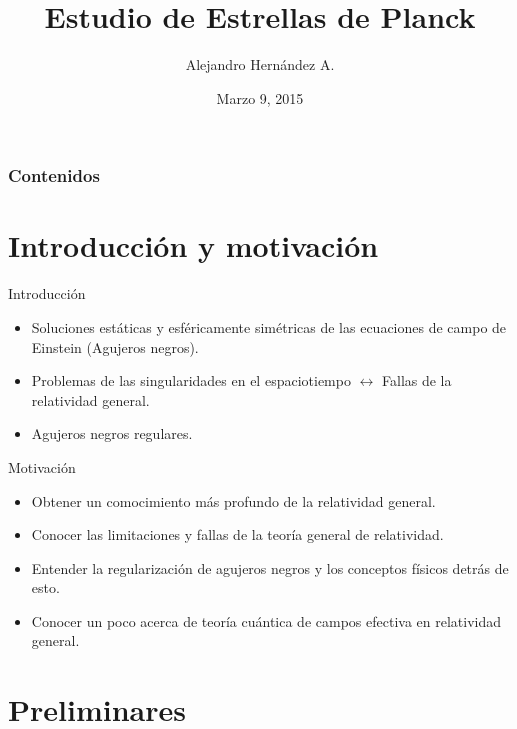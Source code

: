 \documentclass[t]{beamer}
\title[Estrellas de Planck]{Estudio de Estrellas de Planck}
\author[Hernández A.]{Alejandro Hernández A. }
\institute[Uniandes] 
{
Universidad de los Andes, Bogotá, Colombia \\ 
}
\date{Marzo 9, 2015}
\numberwithin{equation}{section}
\begin{document}
\begin{frame}
\titlepage 
\end{frame}

\begin{frame}
\frametitle{Contenidos} 
\tableofcontents 
\end{frame}

\section{Introducción y motivación}

\begin{frame}{Introducción}
\vspace{\fill}
\begin{itemize}
\item Soluciones estáticas y esféricamente simétricas de las ecuaciones de campo de Einstein (Agujeros negros).


\item Problemas de las singularidades en el espaciotiempo $\leftrightarrow$ Fallas de la relatividad general.

\item Agujeros negros regulares.
\end{itemize}
\end{frame}

\begin{frame}{Motivación}
\vspace{\fill}
\begin{itemize}
\item Obtener un comocimiento más profundo de la relatividad general.

\item Conocer las limitaciones y fallas de la teoría general de relatividad.

\item Entender la regularización de agujeros negros y los conceptos físicos detrás de esto.

\item Conocer un poco acerca de teoría cuántica de campos efectiva en relatividad general.

\end{itemize}
\vspace{\fill}
\end{frame}


\section{\label{preliminaries section} Preliminares}
\end{document}
